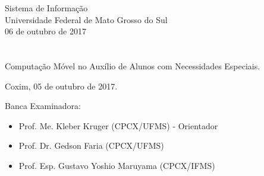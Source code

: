 \vskip 0.5cm
\begin{center}
Sistema de Informação\\
Universidade Federal de Mato Grosso do Sul\\
06 de outubro de 2017
\end{center}
		

\chapter*{}

\begin{center}

\begin{minipage}[t]{10cm}
	\begin{center}
		\vspace{-2cm}
		{{\Large Computação Móvel no Auxílio de Alunos com Necessidades Especiais.}}  
	\end{center}
\end{minipage}

\end{center}


\begin{flushright}
	\vspace{12cm}
	Coxim, 05 de outubro de 2017.
	
\end{flushright}

\vspace{2cm}
Banca Examinadora:

\begin{itemize}
	\item Prof. Me. Kleber Kruger (CPCX/UFMS) - Orientador
	\item Prof. Dr. Gedson Faria (CPCX/UFMS)
	\item Prof. Esp. Gustavo Yoshio Maruyama (CPCX/IFMS)
\end{itemize}
